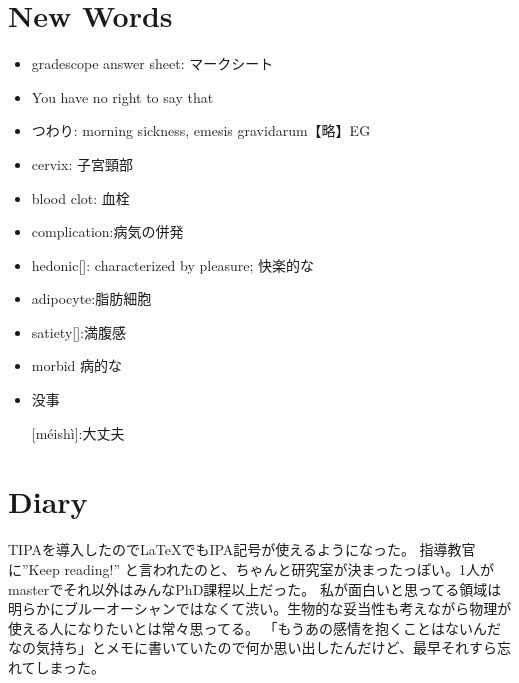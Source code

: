 \documentclass{ltjsarticle}
\numberwithin{equation}{subsection}
\newcommand{\Chinese}[1]{{\begin{CJK*}{UTF8}{gbsn}#1\end{CJK*}}}
\begin{document}
\newpage

\section{New Words}
\begin{itemize}
    \item gradescope answer sheet: マークシート
    \item You have no right to say that
    \item つわり: morning sickness, emesis gravidarum【略】EG
    \item cervix: 子宮頸部
    \item blood clot: 血栓
    \item complication:病気の併発
    \item hedonic[]: characterized by pleasure; 快楽的な
    \item adipocyte:脂肪細胞
    \item satiety[]:満腹感
    \item morbid 病的な
\end{itemize}
\begin{itemize}
    \item \Chinese{没事}[méishì]:大丈夫
\end{itemize}
\section{Diary}
TIPAを導入したので\LaTeX でもIPA記号が使えるようになった。
指導教官に”Keep reading!” と言われたのと、ちゃんと研究室が決まったっぽい。1人がmasterでそれ以外はみんなPhD課程以上だった。
私が面白いと思ってる領域は明らかにブルーオーシャンではなくて渋い。生物的な妥当性も考えながら物理が使える人になりたいとは常々思ってる。
「もうあの感情を抱くことはないんだなの気持ち」とメモに書いていたので何か思い出したんだけど、最早それすら忘れてしまった。
\end{document}
